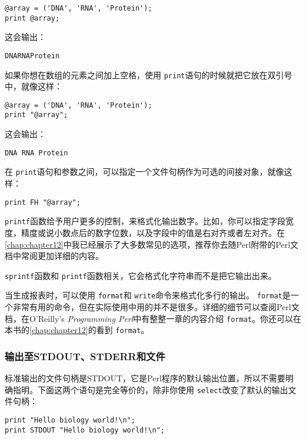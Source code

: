 \begin{lstlisting}
@array = ('DNA', 'RNA', 'Protein');
print @array;
\end{lstlisting}

这会输出：

\begin{lstlisting}
DNARNAProtein
\end{lstlisting}

如果你想在数组的元素之间加上空格，使用 \verb|print|语句的时候就把它放在双引号中，就像这样：

\begin{lstlisting}
@array = ('DNA', 'RNA', 'Protein');
print "@array";
\end{lstlisting}

这会输出：

\begin{lstlisting}
DNA RNA Protein
\end{lstlisting}

在 \verb|print|语句和参数之间，可以指定一个文件句柄作为可选的间接对象，就像这样：

\begin{lstlisting}
print FH "@array";
\end{lstlisting}

 \verb|printf|函数给予用户更多的控制，来格式化输出数字。比如，你可以指定字段宽度，精度或说小数点后的数字位数，以及字段中的值是右对齐或者左对齐。在\autoref{chap:chapter12}中我已经展示了大多数常见的选项，推荐你去随Perl附带的Perl文档中常阅更加详细的内容。

 \verb|sprintf|函数和 \verb|printf|函数相关，它会格式化字符串而不是把它输出出来。

当生成报表时，可以使用 \verb|format|和 \verb|write|命令来格式化多行的输出。 \verb|format|是一个非常有用的命令，但在实际使用中用的并不是很多。详细的细节可以查阅Perl文档，在O'Reilly's \textit{Programming Perl}中有整整一章的内容介绍 \verb|format|。你还可以在本书的\autoref{chap:chapter12}的看到 \verb|format|。

\subsubsection{输出至STDOUT、STDERR和文件}
标准输出的文件句柄是STDOUT，它是Perl程序的默认输出位置，所以不需要明确指明。下面这两个语句是完全等价的，除非你使用 \verb|select|改变了默认的输出文件句柄：

\begin{lstlisting}
print "Hello biology world!\n";
print STDOUT "Hello biology world!\n";
\end{lstlisting}

